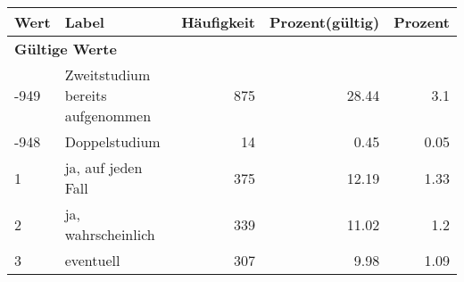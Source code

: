      \begin{longtable}{lXrrr}
     \toprule
     \textbf{Wert} & \textbf{Label} & \textbf{Häufigkeit} & \textbf{Prozent(gültig)} & \textbf{Prozent} \\
     \endhead
     \midrule
     \multicolumn{5}{l}{\textbf{Gültige Werte}}\\

     -949 &
     \multicolumn{1}{X}{ Zweitstudium bereits aufgenommen   } &


       \num{875} &
       \num[round-mode=places,round-precision=2]{28,44} &
         \num[round-mode=places,round-precision=2]{3,1} \\

     -948 &
     \multicolumn{1}{X}{ Doppelstudium   } &


       \num{14} &
       \num[round-mode=places,round-precision=2]{0,45} &
         \num[round-mode=places,round-precision=2]{0,05} \\

     1 &
     \multicolumn{1}{X}{ ja, auf jeden Fall   } &


       \num{375} &
       \num[round-mode=places,round-precision=2]{12,19} &
         \num[round-mode=places,round-precision=2]{1,33} \\

     2 &
     \multicolumn{1}{X}{ ja, wahrscheinlich   } &


       \num{339} &
       \num[round-mode=places,round-precision=2]{11,02} &
         \num[round-mode=places,round-precision=2]{1,2} \\

     3 &
     \multicolumn{1}{X}{ eventuell   } &


       \num{307} &
       \num[round-mode=places,round-precision=2]{9,98} &
         \num[round-mode=places,round-precision=2]{1,09} \\


\end{longtable}
